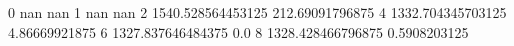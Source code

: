 0 nan nan
1 nan nan
2 1540.528564453125 212.69091796875
4 1332.704345703125 4.86669921875
6 1327.837646484375 0.0
8 1328.428466796875 0.5908203125
